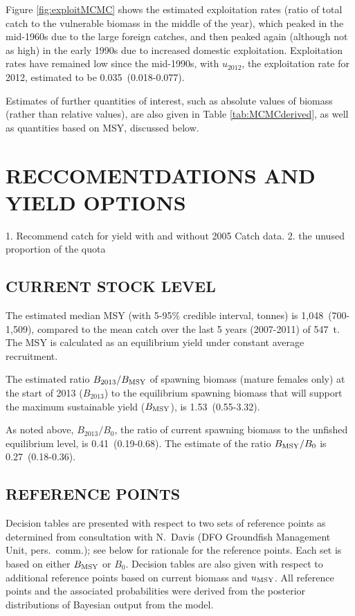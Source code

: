 Figure \ref{fig:exploitMCMC} shows the estimated exploitation rates (ratio of total catch to the vulnerable biomass in the middle of the year), which peaked in the mid-1960s due to the large foreign catches, and then peaked again (although not as high) in the early 1990s due to increased domestic exploitation. Exploitation rates have remained low since the mid-1990s, with $u_{2012}$, the exploitation rate for 2012, estimated to be 0.035~(0.018-0.077).

Estimates of further quantities of interest, such as absolute values of biomass (rather than relative values), are also given in Table \ref{tab:MCMCderived}, as well as quantities based on MSY, discussed below. 

\section{RECCOMENTDATIONS AND YIELD OPTIONS}
1. Recommend catch for yield with and without 2005 Catch data.
2. the unused proportion of the quota

\subsection{CURRENT STOCK LEVEL}

The estimated median MSY (with 5-95\% credible interval, tonnes) is 1,048~(700-1,509), compared to the mean catch over the last 5 years (2007-2011) of 547~t. The MSY is calculated as an equilibrium yield under constant average recruitment. 

The estimated ratio $B_{2013}/B_\mathrm{MSY}$ of spawning biomass (mature females only) at the start of 2013 ($B_{2013}$) to the equilibrium spawning biomass that will support the maximum sustainable yield ($B_\mathrm{MSY}$), is 1.53~(0.55-3.32). 

As noted above, $B_{2013}/B_0$, the ratio of current spawning biomass to the unfished equilibrium level, is 0.41~(0.19-0.68). The estimate of the ratio $B_\mathrm{MSY} / B_0$ is 0.27~(0.18-0.36).

\subsection{REFERENCE POINTS}

Decision tables are presented with respect to two sets of reference points as determined from consultation with N.~Davis (DFO Groundfish Management Unit, pers.~comm.); see below for rationale for the reference points. Each set is based on either $B_\mathrm{MSY}$ or $B_0$. Decision tables are also given with respect to additional reference points based on current biomass and $u_\mathrm{MSY}$. All reference points and the associated probabilities were derived from the posterior distributions of Bayesian output from the model.


